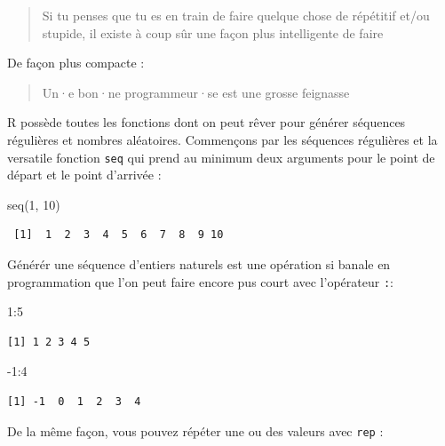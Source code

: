 \documentclass[
  letterpaper,
  DIV=11,
  numbers=noendperiod]{scrreprt}
\newenvironment{Shaded}{\begin{snugshade}}{\end{snugshade}}
\newcommand{\DecValTok}[1]{\textcolor[rgb]{0.68,0.00,0.00}{#1}}
\newcommand{\FunctionTok}[1]{\textcolor[rgb]{0.28,0.35,0.67}{#1}}
\newcommand{\NormalTok}[1]{\textcolor[rgb]{0.00,0.23,0.31}{#1}}
\newcommand{\SpecialCharTok}[1]{\textcolor[rgb]{0.37,0.37,0.37}{#1}}
\begin{document}
\begin{quote}
Si tu penses que tu es en train de faire quelque chose de répétitif
et/ou stupide, il existe à coup sûr une façon plus intelligente de faire
\end{quote}

De façon plus compacte :

\begin{quote}
Un·e bon·ne programmeur·se est une grosse feignasse
\end{quote}

R possède toutes les fonctions dont on peut rêver pour générer séquences
régulières et nombres aléatoires. Commençons par les séquences
régulières et la versatile fonction \texttt{seq} qui prend au minimum
deux arguments pour le point de départ et le point d'arrivée :

\begin{Shaded}
\begin{Highlighting}[]
\FunctionTok{seq}\NormalTok{(}\DecValTok{1}\NormalTok{, }\DecValTok{10}\NormalTok{)}
\end{Highlighting}
\end{Shaded}

\begin{verbatim}
 [1]  1  2  3  4  5  6  7  8  9 10
\end{verbatim}

Générér une séquence d'entiers naturels est une opération si banale en
programmation que l'on peut faire encore pus court avec l'opérateur
\texttt{:}:

\begin{Shaded}
\begin{Highlighting}[]
\DecValTok{1}\SpecialCharTok{:}\DecValTok{5}
\end{Highlighting}
\end{Shaded}

\begin{verbatim}
[1] 1 2 3 4 5
\end{verbatim}

\begin{Shaded}
\begin{Highlighting}[]
\SpecialCharTok{{-}}\DecValTok{1}\SpecialCharTok{:}\DecValTok{4}
\end{Highlighting}
\end{Shaded}

\begin{verbatim}
[1] -1  0  1  2  3  4
\end{verbatim}

De la même façon, vous pouvez répéter une ou des valeurs avec
\texttt{rep} :
\end{document}
